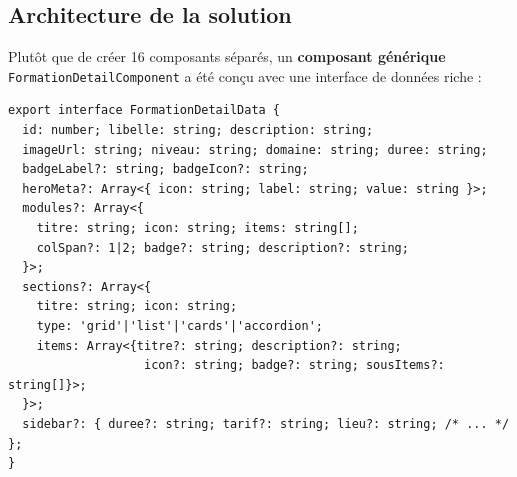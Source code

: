 \documentclass[a4paper,12pt,french]{article}
\begin{document}
\subsection{Architecture de la solution}

Plutôt que de créer 16 composants séparés, un \textbf{composant générique} \texttt{FormationDetailComponent} a été conçu avec une interface de données riche :

\begin{lstlisting}[style=tsstyle]
export interface FormationDetailData {
  id: number; libelle: string; description: string;
  imageUrl: string; niveau: string; domaine: string; duree: string;
  badgeLabel?: string; badgeIcon?: string;
  heroMeta?: Array<{ icon: string; label: string; value: string }>;
  modules?: Array<{
    titre: string; icon: string; items: string[];
    colSpan?: 1|2; badge?: string; description?: string;
  }>;
  sections?: Array<{
    titre: string; icon: string;
    type: 'grid'|'list'|'cards'|'accordion';
    items: Array<{titre?: string; description?: string;
                   icon?: string; badge?: string; sousItems?: string[]}>;
  }>;
  sidebar?: { duree?: string; tarif?: string; lieu?: string; /* ... */ };
}
\end{lstlisting}
\end{document}
